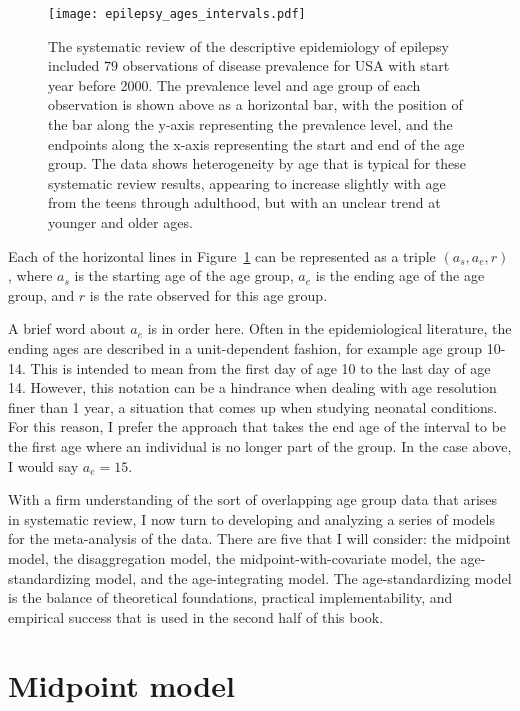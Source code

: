 \begin{figure}[ht]
\begin{center}
\texttt{[image: epilepsy\_ages\_intervals.pdf]}
\caption{The systematic review of the descriptive epidemiology of
  epilepsy included $79$ observations of disease prevalence for USA
  with start year before 2000. The prevalence level and age group of
  each observation is shown above as a horizontal bar, with the
  position of the bar along the y-axis representing the prevalence
  level, and the endpoints along the x-axis representing the start and
  end of the age group.  The data shows heterogeneity by age that is
  typical for these systematic review results, appearing to increase
  slightly with age from the teens through adulthood, but with an unclear trend
  at younger and older ages.  }
\label{theory-age_group_model-dismod_data_plot}
\end{center}
\end{figure}

Each of the horizontal lines in
Figure~\ref{theory-age_group_model-dismod_data_plot} can be
represented as a triple $({a_s}, {a_e}, r)$, where $a_s$ is the
starting age of the age group, $a_e$ is the ending age of the age
group, and $r$ is the rate observed for this age group.

A brief word about ${a_e}$ is in order here.  Often in the
epidemiological literature, the ending ages are described in a
unit-dependent fashion, for example age group 10-14.  This is intended
to mean from the first day of age 10 to the last day of age 14.
However, this notation can be a hindrance when dealing with age
resolution finer than 1 year, a situation that comes up when studying
neonatal conditions.  For this reason, I prefer the approach that
takes the end age of the interval to be the first age where an
individual is no longer part of the group.  In the case above, I would
say ${a_e} = 15$.


With a firm understanding of the sort of overlapping age group data
that arises in systematic review, I now turn to developing and
analyzing a series of models for the meta-analysis of the data.  There
are five that I will consider: the midpoint model, the disaggregation
model, the midpoint-with-covariate model, the age-standardizing model,
and the age-integrating model.  The age-standardizing model is the
balance of theoretical foundations, practical implementability, and
empirical success that is used in the second half of this
book.

\section{Midpoint model}

